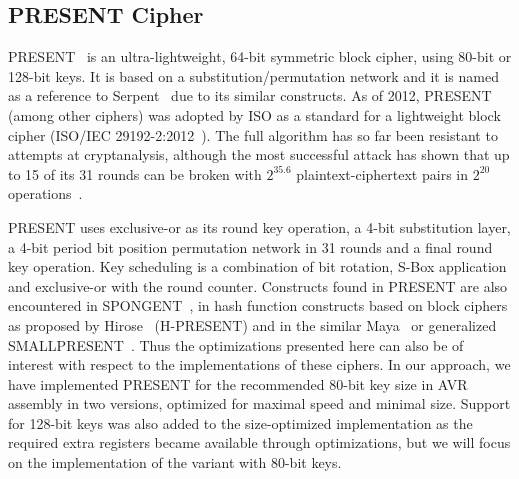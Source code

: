\documentclass[11pt]{llncs2e} %
\begin{document}
\subsection{PRESENT Cipher}
 PRESENT~\cite{bogdanov2007present} is an ultra-lightweight, 64-bit symmetric block cipher, using 80-bit or 128-bit keys.
It is based on a substitution/permutation network and it is named as a reference to Serpent~\cite{anderson1998serpent} due to its similar constructs.
As of 2012, PRESENT (among other ciphers) was adopted by ISO as a standard for a lightweight block cipher (ISO/IEC 29192-2:2012~\cite{present_iso}). The full algorithm has so far been resistant to attempts at cryptanalysis, although the most successful attack has shown that up to 15 of its 31 rounds can be broken with $2^{35.6}$ plaintext-ciphertext pairs in $2^{20}$ operations~\cite{abed2012biclique,collard2009statistical,nakahara2009linear}.

PRESENT uses exclusive-or as its round key operation, a 4-bit substitution layer, a 4-bit period bit position permutation network in 31 rounds and a final round key operation.
Key scheduling is a combination of bit rotation, S-Box application and exclusive-or with the round counter.
Constructs found in PRESENT are also encountered in SPONGENT~\cite{bogdanov2011spongent}, in hash function constructs based on block ciphers as proposed by Hirose~\cite{bogdanov2008hash,hirose2005provably,hirose2006some} (H-PRESENT) and in the similar Maya~\cite{gomathisankaran2009maya} or generalized SMALLPRESENT~\cite{leander2010small}. Thus the optimizations presented here can also be of interest with respect to the implementations of these ciphers. In our approach, we have implemented PRESENT for the recommended 80-bit key size in AVR assembly in two versions, optimized for maximal speed and minimal size.
Support for 128-bit keys was also added to the size-optimized implementation as the required extra registers became available through optimizations, but we will focus on the implementation of the variant with 80-bit keys.
\end{document}
